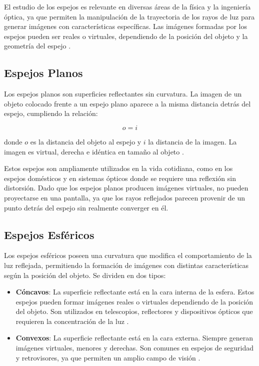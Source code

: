 \documentclass[article,12pt]{elsarticle}
\begin{document}
El estudio de los espejos es relevante en diversas áreas de la física y la ingeniería óptica, ya que permiten la manipulación de la trayectoria de los rayos de luz para generar imágenes con características específicas. Las imágenes formadas por los espejos pueden ser reales o virtuales, dependiendo de la posición del objeto y la geometría del espejo \cite{Serway2002}.

\subsection{Espejos Planos}
Los espejos planos son superficies reflectantes sin curvatura. La imagen de un objeto colocado frente a un espejo plano aparece a la misma distancia detrás del espejo, cumpliendo la relación:

\begin{mdframed}
\begin{equation}
    o = i
\end{equation}
\end{mdframed}
donde $o$ es la distancia del objeto al espejo y $i$ la distancia de la imagen. La imagen es virtual, derecha e idéntica en tamaño al objeto \cite{Pedrotti2018}.

Estos espejos son ampliamente utilizados en la vida cotidiana, como en los espejos domésticos y en sistemas ópticos donde se requiere una reflexión sin distorsión. Dado que los espejos planos producen imágenes virtuales, no pueden proyectarse en una pantalla, ya que los rayos reflejados parecen provenir de un punto detrás del espejo sin realmente converger en él.

\subsection{Espejos Esféricos}
Los espejos esféricos poseen una curvatura que modifica el comportamiento de la luz reflejada, permitiendo la formación de imágenes con distintas características según la posición del objeto. Se dividen en dos tipos:
\begin{itemize}
    \item \textbf{Cóncavos}: La superficie reflectante está en la cara interna de la esfera. Estos espejos pueden formar imágenes reales o virtuales dependiendo de la posición del objeto. Son utilizados en telescopios, reflectores y dispositivos ópticos que requieren la concentración de la luz \cite{Hecht2000}.
    \item \textbf{Convexos}: La superficie reflectante está en la cara externa. Siempre generan imágenes virtuales, menores y derechas. Son comunes en espejos de seguridad y retrovisores, ya que permiten un amplio campo de visión \cite{Tipler1999}.
\end{itemize}
\end{document}

